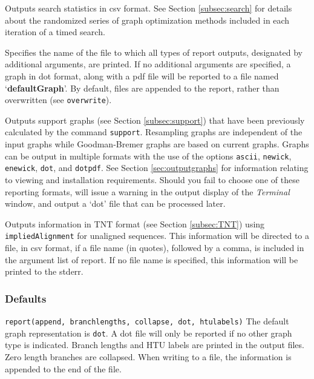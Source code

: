 \begin{description}
\begin{description}
\begin{description}
			\end{description}
				
		\end{description}	
				
		\item[search] Outputs search statistics in csv format. See Section 
		\ref{subsec:search} for details about the randomized series of graph 
		optimization methods included in each iteration of a timed search.
			
		\item [STRING] Specifies the name of the file to which all types of report 
		outputs, designated by additional arguments, are printed. If no additional 
		arguments are specified, a graph in dot format, along with a pdf file will be 
		reported to a file named `\textbf{defaultGraph}'. By default, files are 
		appended to the report, rather than overwritten (see \texttt{overwrite}).
				
		\item[support] Outputs support graphs (see Section \ref{subsec:support})
		that have been previously calculated by the command \texttt{support}. 
		Resampling graphs \citep{Farrisetal1996} are independent of the input graphs 
		while Goodman-Bremer graphs \citep{Goodmanetal1982, bremer1994} are 
		based on current graphs. Graphs can be output in multiple formats with the
		use of the options \texttt{ascii}, \texttt{newick}, \texttt{enewick}, \texttt{dot}, 
		and \texttt{dotpdf}. See Section \ref{sec:outputgraphs} for information relating to 
		viewing and installation requirements. Should you fail to choose one of 
		these reporting formats, \phyg will issue a warning in the output display 
		of the \textit{Terminal} window, and output a `dot' file that can be processed 
		later.
		
		\item[tnt] Outputs information in TNT \citep{Goloboffetal2008} format (see 
		Section \ref{subsec:TNT}) using \texttt{impliedAlignment} for unaligned 
		sequences. This information will be directed to a file, in csv format, if a file 
		name (in quotes), followed by a comma, is included in the argument list of 
		report. If no file name is specified, this information will be printed to the stderr.
				 
	\end{description}			
		
	\subsubsection{Defaults}
		\texttt{report(append, branchlengths, collapse, dot, htulabels)}
		The default graph representation is \texttt{dot}. A dot file will only be 
		reported if no other graph type is indicated. Branch lengths and HTU 
		labels are printed in the output files. Zero length branches are collapsed. 
		When writing to a file, the information is appended to the end of the file. 
		
